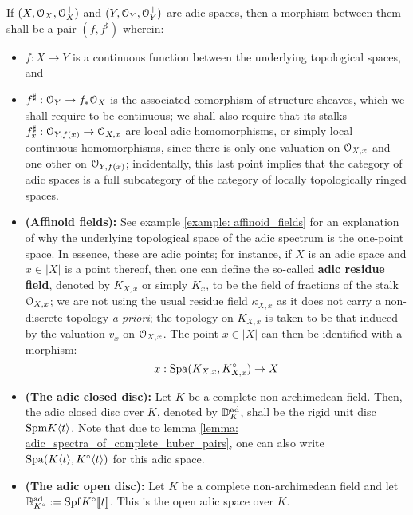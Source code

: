                     \begin{definition}
                        If $(X, \mathcal{O}_X, \mathcal{O}_X^+)$ and $(Y, \mathcal{O}_Y, \mathcal{O}_Y^+)$ are adic spaces, then a morphism between them shall be a pair $(f, f^{\sharp})$ wherein:
                            \begin{itemize}
                                \item $f: X \to Y$ is a continuous function between the underlying topological spaces, and
                                \item $f^{\sharp}: \mathcal{O}_Y \to f_*\mathcal{O}_X$ is the associated comorphism of structure sheaves, which we shall require to be continuous; we shall also require that its stalks $f^{\sharp}_x: \mathcal{O}_{Y, f(x)} \to \mathcal{O}_{X, x}$ are local adic homomorphisms, or simply local continuous homomorphisms, since there is only one valuation on $\mathcal{O}_{X, x}$ and one other on $\mathcal{O}_{Y, f(x)}$; incidentally, this last point implies that the category of adic spaces is a full subcategory of the category of locally topologically ringed spaces.
                            \end{itemize}
                    \end{definition}
                    \begin{example} \label{example: adic_spaces}
                        \noindent
                        \begin{itemize}
                            \item \textbf{(Affinoid fields):} See example \ref{example: affinoid_fields} for an explanation of why the underlying topological space of the adic spectrum is the one-point space. In essence, these are adic points; for instance, if $X$ is an adic space and $x \in |X|$ is a point thereof, then one can define the so-called \textbf{adic residue field}, denoted by $K_{X, x}$ or simply $K_x$, to be the field of fractions of the stalk $\mathcal{O}_{X, x}$; we are not using the usual residue field $\kappa_{X, x}$ as it does not carry a non-discrete topology \textit{a priori}; the topology on $K_{X, x}$ is taken to be that induced by the valuation $v_x$ on $\mathcal{O}_{X, x}$. The point $x \in |X|$ can then be identified with a morphism:
                                $$x: \mathrm{Spa}(K_{X, x}, K_{X, x}^{\circ}) \to X$$
                            \item \textbf{(The adic closed disc):} Let $K$ be a complete non-archimedean field. Then, the adic closed disc over $K$, denoted by $\mathbb{D}_K^{\mathrm{ad}}$, shall be the rigid unit disc $\mathrm{Spm} K\langle t\rangle$. Note that due to lemma \ref{lemma: adic_spectra_of_complete_huber_pairs}, one can also write $\mathrm{Spa}(K\langle t\rangle, K^{\circ}\langle t\rangle)$ for this adic space.
                            \item \textbf{(The adic open disc):} Let $K$ be a complete non-archimedean field and let $\mathbb{B}^{\mathrm{ad}}_{K^{\circ}} := \mathrm{Spf} K^{\circ}[\![t]\!]$. This is the open adic space over $K$.
                        \end{itemize}
                    \end{example}
                    
